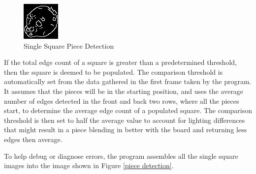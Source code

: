 \documentclass[journal]{IEEEtran}
\begin{document}
\begin{figure}[!ht]
	\centering
	\includegraphics[width=\linewidth]{Images/PieceDetection340Zoomed.jpg}
	\caption{Single Square Piece Detection}
	\label{piece detection zoomed}
\end{figure}

If the total edge count of a square is greater than a predetermined threshold, then the square is deemed to be populated. The comparison threshold is automatically set from the data gathered in the first frame taken by the program. It assumes that the pieces will be in the starting position, and uses the average number of edges detected in the front and back two rows, where all the pieces start, to determine the average edge count of a populated square. The comparison threshold is then set to half the average value to account for lighting differences that might result in a piece blending in better with the board and returning less edges then average.

To help debug or diagnose errors, the program assembles all the single square images into the image shown in Figure \ref{piece detection}.
\end{document}
